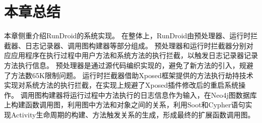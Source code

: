  \section{本章总结}

本章侧重介绍RunDroid的系统实现。
在整体上，RunDroid由预处理器、运行时拦截器、日志记录器、调用图构建器等部分组成。
预处理器和运行时拦截器分别对应应用程序在执行过程中用户方法和系统方法的执行拦截，以触发日志记录器记录方法执行信息。
预处理器是通过源代码编织实现的，避免了新方法的引入，规避了方法数65K限制问题。
运行时拦截器借助Xposed框架提供的方法执行劫持技术实现对系统方法的执行拦截，在实现上规避了Xposed插件修改后的重启系统操作。
调用图构建器将运行过程中方法执行的日志信息作为输入，在Neo4j图数据库上构建函数调用图，利用图中方法和对象之间的关系，利用Soot和Cypher语句实现Activity生命周期的构建、方法触发关系的生成，形成最终的扩展函数调用图。
